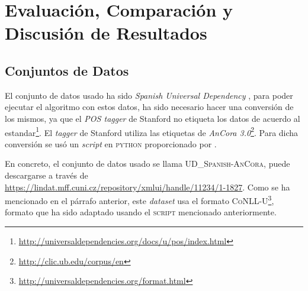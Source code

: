 \chapter{Evaluación, Comparación y Discusión de Resultados}
\label{ch:eval}

\section{Conjuntos de Datos}
\label{sec:datasets}

El conjunto de datos usado ha sido \emph{Spanish Universal
  Dependency} \cite{udv14}, para poder ejecutar el algoritmo con estos datos, ha
sido necesario hacer una conversión de los mismos, ya que el \emph{\ac{POS}
  tagger} de Stanford no etiqueta los datos de acuerdo al
estandar\footnote{\url{http://universaldependencies.org/docs/u/pos/index.html}}. El
\emph{tagger} de Stanford utiliza las etiquetas de \emph{AnCora
  3.0}\footnote{\url{http://clic.ub.edu/corpus/en}}. Para dicha conversión se
usó un \emph{script} en \textsc{python} proporcionado por \citeauthor{rohit2016}
\cite{rohit2016}.

En concreto, el conjunto de datos usado se llama \textsc{UD\_Spanish-AnCora},
puede descargarse a través de
\url{https://lindat.mff.cuni.cz/repository/xmlui/handle/11234/1-1827}. Como se
ha mencionado en el párrafo anterior, este \emph{dataset} usa el formato
\textsc{CoNLL-U}\footnote{\url{http://universaldependencies.org/format.html}},
formato que ha sido adaptado usando el \textsc{script} mencionado anteriormente.

